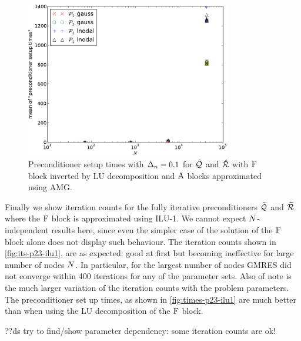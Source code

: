 \begin{figure}
  \centering
  \includegraphics[width=0.8\textwidth]{plots/linear_solvers_p2p3/implicitexact-meanofpreconditionersetuptimesvsinitialnnode.pdf}
  \caption{Preconditioner setup times with $\Delta_{n}=0.1$ for $\hat{\mathcal{Q}}$ and $\hat{\mathcal{R}}$ with $\mathrm{F}$ block inverted by LU decomposition and $\mathrm{A}$ blocks approximated using AMG.}
  \label{fig:times-p23-exact}
\end{figure}


Finally we show iteration counts for the fully iterative preconditioners $\widetilde{\mathcal{Q}}$ and $\widetilde{\mathcal{R}}$ where the $\mathrm{F}$ block is approximated using ILU-1.
We cannot expect $N$-independent results here, since even the simpler case of the solution of the $\mathrm{F}$ block alone does not display such behaviour.
The iteration counts shown in \cref{fig:its-p23-ilu1}, are as expected: good at first but becoming ineffective for large number of nodes $N$.
In particular, for the largest number of nodes GMRES did not converge within 400 iterations for any of the parameter sets.
Also of note is the much larger variation of the iteration counts with the problem parameters.
The preconditioner set up times, as shown in \cref{fig:times-p23-ilu1} are much better than when using the LU decomposition of the $\mathrm{F}$ block.

??ds try to find/show parameter dependency: some iteration counts are ok!

